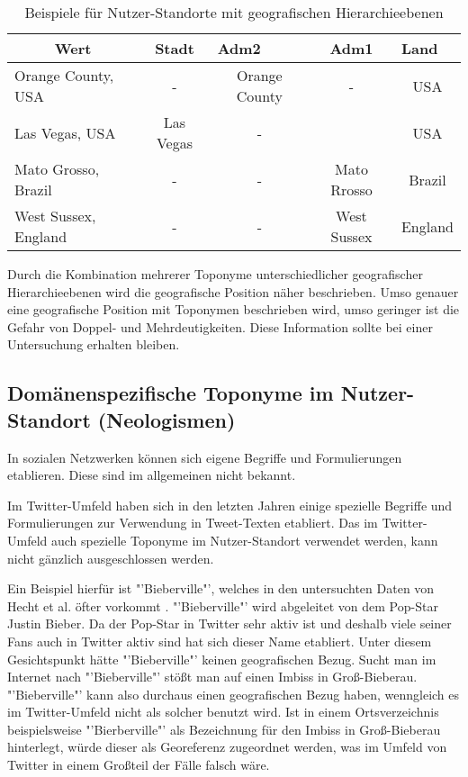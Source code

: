 			\begin{table}[h]
			\centering
			\caption{Beispiele für Nutzer-Standorte mit geografischen Hierarchieebenen}
			\label{tab:geografischeHierarchie}
			\begin{tabular}{|l|c|c|c|c|}
			\hline
			\multicolumn{1}{|c|}{Wert} & Stadt       & \multicolumn{1}{l|}{Adm2} & Adm1 & \multicolumn{1}{l|}{Land} \\ \hline
			Orange County, USA 		   & - 			 & Orange County										 & - 							   & USA    					\\ \hline
			Las Vegas, USA 		       & Las Vegas   & - 												     &								   & USA 					    \\ \hline
			Mato Grosso, Brazil        & -           & -                                                     & Mato Rrosso                     & Brazil                    \\ \hline
			West Sussex, England       & -           & -                                                     & West Sussex                     & England                   \\ \hline
			\end{tabular}
			\end{table}
 
			Durch die Kombination mehrerer Toponyme unterschiedlicher geografischer Hierarchieebenen wird die geografische Position näher beschrieben.
			Umso genauer eine geografische Position mit Toponymen beschrieben wird, umso geringer ist die Gefahr von Doppel- und Mehrdeutigkeiten.  
			Diese Information sollte bei einer Untersuchung erhalten bleiben.
			
		\subsection{Domänenspezifische Toponyme im Nutzer-Standort (Neologismen)} \label{sub:domaenenspezBezug} 

			In sozialen Netzwerken können sich eigene Begriffe und Formulierungen etablieren. 
			Diese sind im allgemeinen nicht bekannt.


			Im Twitter-Umfeld haben sich in den letzten Jahren einige spezielle Begriffe und Formulierungen zur Verwendung in Tweet-Texten etabliert. 
			Das im Twitter-Umfeld auch spezielle Toponyme im Nutzer-Standort verwendet werden, kann nicht gänzlich ausgeschlossen werden. 

			Ein Beispiel hierfür ist "'Bieberville"', welches in den untersuchten Daten von Hecht et al. öfter vorkommt \cite{Hecht2011}.
			"'Bieberville"' wird abgeleitet von dem Pop-Star Justin Bieber.	
			Da der Pop-Star in Twitter sehr aktiv ist und deshalb viele seiner Fans auch in Twitter aktiv sind hat sich dieser Name etabliert.
			Unter diesem Gesichtspunkt hätte "'Bieberville"' keinen geografischen Bezug.
			Sucht man im Internet nach "'Bieberville"' stößt man auf einen Imbiss in Groß-Bieberau.
			"'Bieberville"' kann also durchaus einen geografischen Bezug haben, wenngleich es im Twitter-Umfeld nicht als solcher benutzt wird. 
			Ist in einem Ortsverzeichnis beispielsweise "'Bierberville"' als Bezeichnung für den Imbiss in Groß-Bieberau hinterlegt, würde dieser als Georeferenz zugeordnet werden, was im Umfeld von Twitter in einem Großteil der Fälle falsch wäre.

